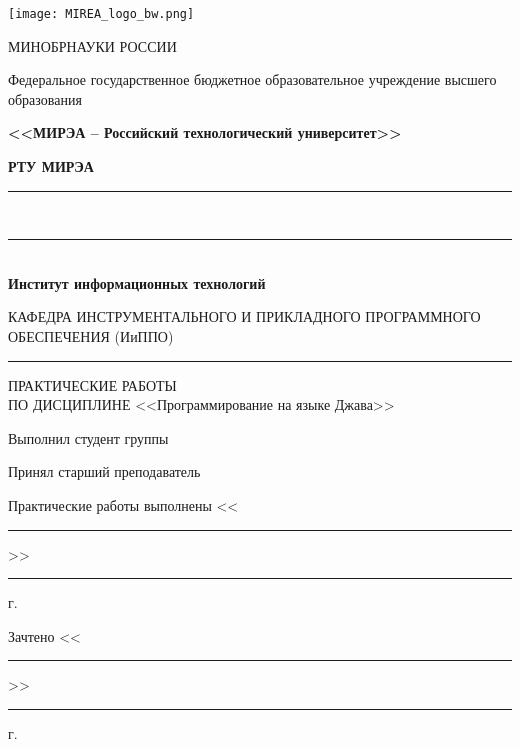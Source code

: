 
\begin{titlepage}
	\begin{center}
		\texttt{[image: MIREA\_logo\_bw.png]}
		
		\hfill \break
		{\small МИНОБРНАУКИ РОССИИ}
		
		Федеральное государственное бюджетное образовательное учреждение высшего образования
		
		\textbf{<<МИРЭА – Российский технологический университет>>}
		
		\textbf{РТУ МИРЭА}
		
		\rule{\linewidth}{0.5pt} \\ [-0.65cm]
		\rule{\linewidth}{0.5pt} \\ [+0.35cm]
		
		\textbf{\huge{Институт информационных технологий}}
		
		\vspace{0.5cm}
		
		КАФЕДРА ИНСТРУМЕНТАЛЬНОГО И ПРИКЛАДНОГО ПРОГРАММНОГО ОБЕСПЕЧЕНИЯ (ИиППО)
		
		\rule{\linewidth}{0.5pt}
		
		\vfill
		
		ПРАКТИЧЕСКИЕ РАБОТЫ \\ ПО ДИСЦИПЛИНЕ <<Программирование на языке Джава>>		
		
		\vfill
		
		\makeatletter				
		
		\ifdefined\@author
		Выполнил студент
			\ifdefined\@group
			группы \hfill \@group
			\fi
		\hfill \@author \\
		\fi
		
		\ifdefined\@teacher
		Принял старший преподаватель \hfill \@teacher \\
		\fi
		
		\hfill \break
		Практические работы выполнены
		\hfill 
		<<\rule{0.5cm}{0.5pt}>>\rule{2cm}{0.5pt} \the\year г.

		\hfill \break
		Зачтено
		\hfill 
		<<\rule{0.5cm}{0.5pt}>>\rule{2cm}{0.5pt} \the\year г.

		
		\makeatother
		
		\vfill
		
		\thispagestyle{titlepagefooter}
	\end{center}
	\clearpage
\end{titlepage}
